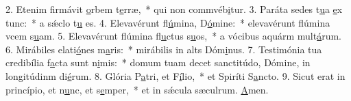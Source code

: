 2. Etenim firmávit \uline{o}rbem t\uline{e}rræ,~* qui non commvéb\uline{i}tur.
3. Paráta sedes t\uline{u}a \uline{e}x tunc:~* a sǽclo t\uline{u} es.
4. Elevavérunt fl\uline{ú}mina, D\uline{ó}mine:~* elevavérunt flúmina vcem s\uline{u}am.
5. Elevavérunt flúmina fl\uline{u}ctus s\uline{u}os,~* a vócibus aquárm mult\uline{á}rum.
6. Mirábiles elati\uline{ó}nes m\uline{a}ris:~* mirábilis in alts Dóm\uline{i}nus.
7. Testimónia tua credibília f\uline{a}cta sunt n\uline{i}mis:~* domum tuam decet sanctitúdo, Dómine, in longitúdinm di\uline{é}rum.
8. Glória P\uline{a}tri, et F\uline{í}lio,~* et Spiríti S\uline{a}ncto.
9. Sicut erat in princípio, et n\uline{u}nc, et s\uline{e}mper,~* et in sǽcula sæculrum. \uline{A}men.
